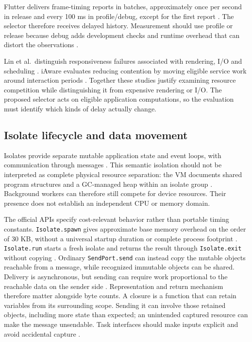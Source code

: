 \documentclass[14pt,a4paper,oneside]{extreport}
\begin{document}
Flutter delivers frame-timing reports in batches, approximately once per second in release and
every 100 ms in profile/debug, except for the first report \citep{flutter-timings}. The
selector therefore receives delayed history. Measurement should use profile or release because
debug adds development checks and runtime overhead that can distort the observations
\citep{flutter-frame}.

Lin et al.~distinguish responsiveness failures associated with rendering, I/O and scheduling
\citep[Secs. 2.2, 4.2--4.3]{lin2024}. iAware evaluates reducing contention by moving eligible
service work around interaction periods \citep[Secs. 3--5]{iaware2023}. Together these studies
justify examining resource competition while distinguishing it from expensive rendering or
I/O. The proposed selector acts on eligible application computations, so the evaluation must
identify which kinds of delay actually change.

\subsection{Isolate lifecycle and data movement}
\label{isolate-lifecycle-and-data-movement}

Isolates provide separate mutable application state and event loops, with communication
through messages \citep{flutter-isolates}. This semantic isolation should not be interpreted
as complete physical resource separation: the VM documents shared program structures and a
GC-managed heap within an isolate group \citep{dart-vm}. Background workers can therefore
still compete for device resources. Their presence does not establish an independent CPU or
memory domain.

The official APIs specify cost-relevant behavior rather than portable timing constants.
\texttt{Isolate.spawn} gives approximate base memory overhead on the order of 30 KB, without a
universal startup duration or complete process footprint \citep{dart-spawn}.
\texttt{Isolate.run} starts a fresh isolate and returns the result through
\texttt{Isolate.exit} without copying \citep{dart-run}. Ordinary \texttt{SendPort.send} can
instead copy the mutable objects reachable from a message, while recognized immutable objects
can be shared. Delivery is asynchronous, but sending can require work proportional to the
reachable data on the sender side \citep{dart-send}. Representation and return mechanism
therefore matter alongside byte counts. A closure is a function that can retain variables from
its surrounding scope. Sending it can involve those retained objects, including more state
than expected; an unintended captured resource can make the message unsendable. Task
interfaces should make inputs explicit and avoid accidental capture
\citep{dart-run, dart-spawn}.
\end{document}
